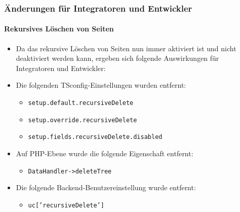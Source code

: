 %

\begin{frame}[fragile]
	\frametitle{Änderungen für Integratoren und Entwickler}
	\framesubtitle{Rekursives Löschen von Seiten}

	\lstset{basicstyle=\tiny\ttfamily}

	\begin{itemize}
		\item Da das rekursive Löschen von Seiten nun immer aktiviert ist und nicht deaktiviert werden kann,
			ergeben sich folgende Auswirkungen für Integratoren und Entwickler:
		\item Die folgenden TSconfig-Einstellungen wurden entfernt:

			\begin{itemize}
				\item \texttt{setup.default.recursiveDelete}
				\item \texttt{setup.override.recursiveDelete}
				\item \texttt{setup.fields.recursiveDelete.disabled}
			\end{itemize}

		\item Auf PHP-Ebene wurde die folgende Eigenschaft entfernt:

			\begin{itemize}
				\item \texttt{DataHandler->deleteTree}
			\end{itemize}

		\item Die folgende Backend-Benutzereinstellung wurde entfernt:

			\begin{itemize}
				\item \texttt{uc['recursiveDelete']}
			\end{itemize}

	\end{itemize}

\end{frame}


